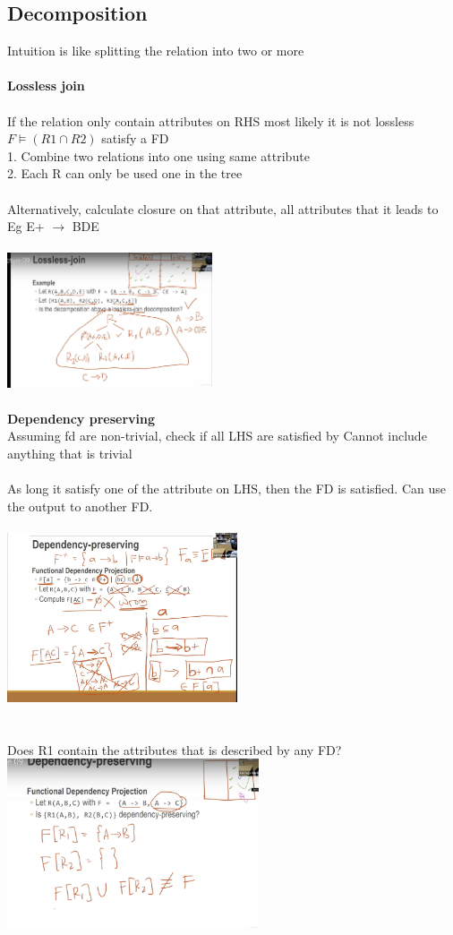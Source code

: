 \documentclass[11pt]{article}
\begin{document}
\subsection*{Decomposition}
Intuition is like splitting the relation into two or more\\\\
\textbf{Lossless join}\\\\
If the relation only contain attributes on RHS most likely it is not lossless
\\
$F \models (R1 \cap R2)$ satisfy a FD\\
1. Combine two relations into one using same attribute\\
2. Each R can only be used one in the tree\\\\
Alternatively, calculate closure on that attribute, all attributes that it leads to \\
Eg E+ $\rightarrow$ BDE 
\\\\
\includegraphics[height=4cm]{images/s1.png}
\\\\
\textbf{Dependency preserving}\\
Assuming fd are non-trivial, check if all LHS are satisfied by 
Cannot include anything that is trivial\\\\
As long it satisfy one of the attribute on LHS, then the FD is satisfied. Can use the output to another FD.\\\\
\includegraphics[height=5cm]{images/s2.png}
\\\\\\
Does R1 contain the attributes that is described by any FD?\\
\includegraphics[height=5cm]{images/s3.png}
\end{document}
